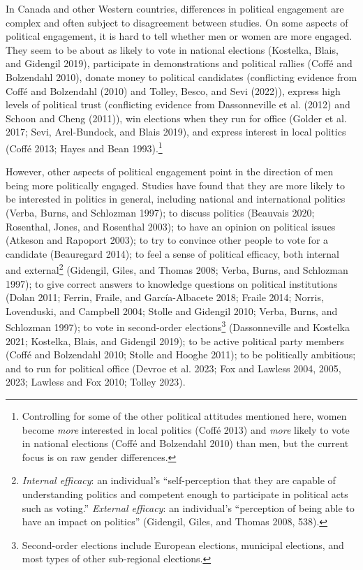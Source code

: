 \documentclass[
  letterpaper,
  DIV=11,
  numbers=noendperiod]{scrreprt}
\begin{document}
In Canada and other Western countries, differences in political
engagement are complex and often subject to disagreement between
studies. On some aspects of political engagement, it is hard to tell
whether men or women are more engaged. They seem to be about as likely
to vote in national elections (Kostelka, Blais, and Gidengil 2019),
participate in demonstrations and political rallies (Coffé and
Bolzendahl 2010), donate money to political candidates (conflicting
evidence from Coffé and Bolzendahl (2010) and Tolley, Besco, and Sevi
(2022)), express high levels of political trust (conflicting evidence
from Dassonneville et al. (2012) and Schoon and Cheng (2011)), win
elections when they run for office (Golder et al. 2017; Sevi,
Arel-Bundock, and Blais 2019), and express interest in local politics
(Coffé 2013; Hayes and Bean 1993).\footnote{Controlling for some of the
  other political attitudes mentioned here, women become \emph{more}
  interested in local politics (Coffé 2013) and \emph{more} likely to
  vote in national elections (Coffé and Bolzendahl 2010) than men, but
  the current focus is on raw gender differences.}

However, other aspects of political engagement point in the direction of
men being more politically engaged. Studies have found that they are
more likely to be interested in politics in general, including national
and international politics (Verba, Burns, and Schlozman 1997); to
discuss politics (Beauvais 2020; Rosenthal, Jones, and Rosenthal 2003);
to have an opinion on political issues (Atkeson and Rapoport 2003); to
try to convince other people to vote for a candidate (Beauregard 2014);
to feel a sense of political efficacy, both internal and
external\footnote{\emph{Internal efficacy}: an individual's
  ``self-perception that they are capable of understanding politics and
  competent enough to participate in political acts such as voting.''
  \emph{External efficacy}: an individual's ``perception of being able
  to have an impact on politics'' (Gidengil, Giles, and Thomas 2008,
  538).} (Gidengil, Giles, and Thomas 2008; Verba, Burns, and Schlozman
1997); to give correct answers to knowledge questions on political
institutions (Dolan 2011; Ferrin, Fraile, and García-Albacete 2018;
Fraile 2014; Norris, Lovenduski, and Campbell 2004; Stolle and Gidengil
2010; Verba, Burns, and Schlozman 1997); to vote in second-order
elections\footnote{Second-order elections include European elections,
  municipal elections, and most types of other sub-regional elections.}
(Dassonneville and Kostelka 2021; Kostelka, Blais, and Gidengil 2019);
to be active political party members (Coffé and Bolzendahl 2010; Stolle
and Hooghe 2011); to be politically ambitious; and to run for political
office (Devroe et al. 2023; Fox and Lawless 2004, 2005, 2023; Lawless
and Fox 2010; Tolley 2023).
\end{document}

